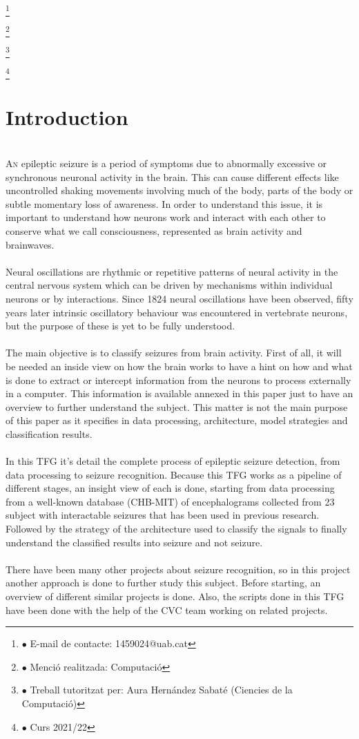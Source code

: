 ﻿\documentclass[10pt,a4paper,twocolumn,twoside]{article}
\newcommand\blfootnote[1]{%
  \begingroup
  \renewcommand\thefootnote{}\footnote{#1}%
  \addtocounter{footnote}{-1}%
  \endgroup
}
\begin{document}
\blfootnote{$\bullet$ E-mail de contacte: 1459024@uab.cat}
\blfootnote{$\bullet$ Menció realitzada: Computació }
\blfootnote{$\bullet$ Treball tutoritzat per: Aura Hernández Sabaté (Ciencies de la Computació)}
\blfootnote{$\bullet$ Curs 2021/22}

\section{Introduction}
\leavevmode\\
\lettrine[lines=3]{A}{n} epileptic seizure is a period of symptoms due to abnormally excessive or synchronous neuronal activity in the brain. This can cause different effects like uncontrolled shaking movements involving much of the body, parts of the body or subtle momentary loss of awareness. In order to understand this issue, it is important to understand how neurons work and interact with each other to conserve what we call consciousness, represented as brain activity and brainwaves.
\\\\
Neural oscillations are rhythmic or repetitive patterns of neural activity in the central nervous system which can be driven by mechanisms within individual neurons or by interactions. Since 1824 neural oscillations have been observed, fifty years later intrinsic oscillatory behaviour was encountered in vertebrate neurons, but the purpose of these is yet to be fully understood.
\\\\
The main objective is to classify seizures from brain activity. First of all, it will be needed an inside view on how the brain works to have a hint on how and what is done to extract or intercept information from the neurons to process externally in a computer. This information is available annexed in this paper just to have an overview to further understand the subject. This matter is not the main purpose of this paper as it specifies in data processing, architecture, model strategies and classification results.
\\\\
In this TFG it’s detail the complete process of epileptic seizure detection, from data processing to seizure recognition. Because this TFG works as a pipeline of different stages, an insight view of each is done, starting from data processing from a well-known database (CHB-MIT) of encephalograms collected from 23 subject with interactable seizures that has been used in previous research. Followed by the strategy of the architecture used to classify the signals to finally understand the classified results into seizure and not seizure.
\\\\
There have been many other projects about seizure recognition, so in this project another approach is done to further study this subject. Before starting, an overview of different similar projects is done. Also, the scripts done in this TFG have been done with the help of the CVC team working on related projects.
\end{document}
